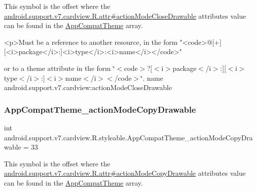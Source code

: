This symbol is the offset where the \hyperlink{classandroid_1_1support_1_1v7_1_1cardview_1_1R_1_1attr_a9197804bc6204b298b271ae47a72529a}{android.\+support.\+v7.\+cardview.\+R.\+attr\#action\+Mode\+Close\+Drawable} attribute\textquotesingle{}s value can be found in the \hyperlink{classandroid_1_1support_1_1v7_1_1cardview_1_1R_1_1styleable_a52e6f69f954ecc2622d72c0b4d298938}{App\+Compat\+Theme} array.

\begin{DoxyVerb}      <p>Must be a reference to another resource, in the form "<code>@[+][<i>package</i>:]<i>type</i>:<i>name</i></code>"
\end{DoxyVerb}
 or to a theme attribute in the form \char`\"{}$<$code$>$?\mbox{[}$<$i$>$package$<$/i$>$\+:\mbox{]}\mbox{[}$<$i$>$type$<$/i$>$\+:\mbox{]}$<$i$>$name$<$/i$>$$<$/code$>$\char`\"{}.  name android.\+support.\+v7.\+cardview\+:action\+Mode\+Close\+Drawable \mbox{\label{classandroid_1_1support_1_1v7_1_1cardview_1_1R_1_1styleable_ab9c8337b10dc73ac0b10a666f25230bb}} 
\subsubsection{\texorpdfstring{App\+Compat\+Theme\+\_\+action\+Mode\+Copy\+Drawable}{AppCompatTheme\_actionModeCopyDrawable}}
{\footnotesize\ttfamily int android.\+support.\+v7.\+cardview.\+R.\+styleable.\+App\+Compat\+Theme\+\_\+action\+Mode\+Copy\+Drawable = 33\hspace{0.3cm}{\ttfamily [static]}}

This symbol is the offset where the \hyperlink{classandroid_1_1support_1_1v7_1_1cardview_1_1R_1_1attr_aa61ebc172827a1041ec930a83575be69}{android.\+support.\+v7.\+cardview.\+R.\+attr\#action\+Mode\+Copy\+Drawable} attribute\textquotesingle{}s value can be found in the \hyperlink{classandroid_1_1support_1_1v7_1_1cardview_1_1R_1_1styleable_a52e6f69f954ecc2622d72c0b4d298938}{App\+Compat\+Theme} array.

